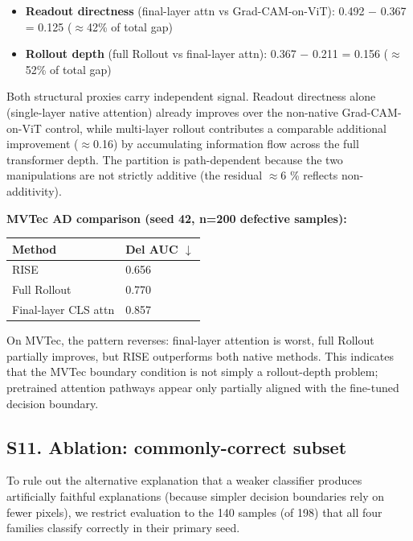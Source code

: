 \documentclass[11pt,a4paper]{article}
\begin{document}
\begin{itemize}
\item \textbf{Readout directness} (final-layer attn vs Grad-CAM-on-ViT): 0.492 $-$ 0.367 = 0.125 ($\approx$42\% of total gap)
\item \textbf{Rollout depth} (full Rollout vs final-layer attn): 0.367 $-$ 0.211 = 0.156 ($\approx$52\% of total gap)
\end{itemize}

Both structural proxies carry independent signal. Readout directness alone (single-layer native attention) already improves over the non-native Grad-CAM-on-ViT control, while multi-layer rollout contributes a comparable additional improvement ($\approx$0.16) by accumulating information flow across the full transformer depth. The partition is path-dependent because the two manipulations are not strictly additive (the residual $\approx$6 \% reflects non-additivity).

\textbf{MVTec AD comparison (seed 42, n=200 defective samples):}

\begin{tabular}{ll}
\toprule
Method & Del AUC $\downarrow$ \\
\midrule
RISE & 0.656 \\
Full Rollout & 0.770 \\
Final-layer CLS attn & 0.857 \\
\bottomrule
\end{tabular}


On MVTec, the pattern reverses: final-layer attention is worst, full Rollout partially improves, but RISE outperforms both native methods. This indicates that the MVTec boundary condition is not simply a rollout-depth problem; pretrained attention pathways appear only partially aligned with the fine-tuned decision boundary.

\subsection*{S11. Ablation: commonly-correct subset}

To rule out the alternative explanation that a weaker classifier produces artificially faithful explanations (because simpler decision boundaries rely on fewer pixels), we restrict evaluation to the 140 samples (of 198) that all four families classify correctly in their primary seed.
\end{document}
